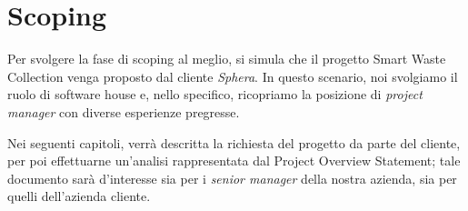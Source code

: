 \section{Scoping}
\label{sec:scoping}

Per svolgere la fase di scoping al meglio, si simula che il progetto Smart Waste Collection venga proposto dal cliente \textit{Sphera}.
In questo scenario, noi svolgiamo il ruolo di software house e, nello specifico, ricopriamo la posizione di \textit{project manager} con diverse esperienze pregresse.

Nei seguenti capitoli, verrà descritta la richiesta del progetto da parte del cliente, per poi effettuarne un'analisi rappresentata dal Project Overview Statement; tale documento sarà d'interesse sia per i \textit{senior manager} della nostra azienda, sia per quelli dell'azienda cliente.

